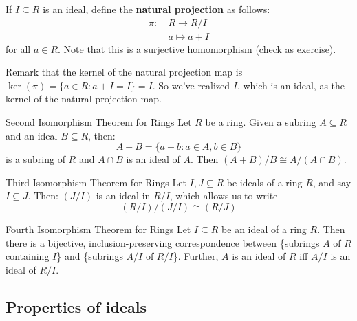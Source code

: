 \documentclass{article}
\theoremstyle{plain}
\begin{document}
\begin{definition}{}{}
If $I \subseteq R$ is an ideal, define the \textbf{natural projection} as follows:
\begin{align*}
\pi : \	&R \to R/I \\
	&a \mapsto a + I
\end{align*}
for all $a \in R$. Note that this is a surjective homomorphism (check as exercise).
\end{definition}
Remark that the kernel of the natural projection map is $\ker(\pi) = \{ a \in R : a + I = I \} = I$. So we've realized $I$, which is an ideal, as the kernel of the natural projection map.

\begin{theorem}{Second Isomorphism Theorem for Rings}{}
Let $R$ be a ring. Given a subring $A \subseteq R$ and an ideal $B \subseteq R$, then:
$$A + B = \{ a + b : a\in A, b \in B \}$$
is a subring of $R$ and $A \cap B$ is an ideal of $A$. Then $(A+B)/B \cong A/(A\cap B)$.
\end{theorem}

\begin{theorem}{Third Isomorphism Theorem for Rings}{}
Let $I,J\subseteq R$ be ideals of a ring $R$, and say $I \subseteq J$. Then:
$(J/I)$ is an ideal in $R/I$, which allows us to write
$$(R/I)/(J/I) \cong (R/J)$$
\end{theorem}

\begin{theorem}{Fourth Isomorphism Theorem for Rings}{}
Let $I \subseteq R$ be an ideal of a ring $R$. Then there is a bijective, inclusion-preserving correspondence between \{subrings $A$ of $R$ containing $I$\} and \{subrings $A/I$ of $R/I$\}. Further, $A$ is an ideal of $R$ iff $A/I$ is an ideal of $R/I$.
\end{theorem}

\subsection{Properties of ideals}
\end{document}

